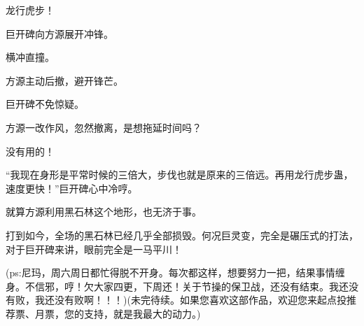 \begin{this_body}
龙行虎步！

巨开碑向方源展开冲锋。

横冲直撞。

方源主动后撤，避开锋芒。

巨开碑不免惊疑。

方源一改作风，忽然撤离，是想拖延时间吗？

没有用的！

“我现在身形是平常时候的三倍大，步伐也就是原来的三倍远。再用龙行虎步蛊，速度更快！”巨开碑心中冷哼。

就算方源利用黑石林这个地形，也无济于事。

打到如今，全场的黑石林已经几乎全部损毁。何况巨灵变，完全是碾压式的打法，对于巨开碑来讲，眼前完全是一马平川！

(ps:尼玛，周六周日都忙得脱不开身。每次都这样，想要努力一把，结果事情缠身。不信邪，哼！欠大家四更，下周还！关于节操的保卫战，还没有结束。我还没有败，我还没有败啊！！！)(未完待续。如果您喜欢这部作品，欢迎您来起点投推荐票、月票，您的支持，就是我最大的动力。)

\end{this_body}

